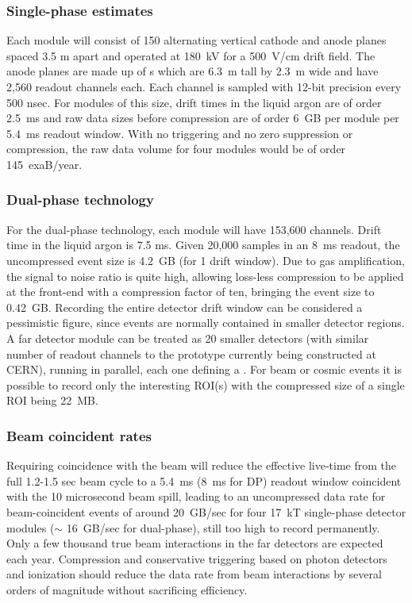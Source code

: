 \subsubsection{Single-phase estimates}
 Each    module will consist of 
150 alternating vertical cathode and anode planes  spaced 3.5 m apart and operated at 180~kV for a 500~V/cm drift field.  The anode planes are made up of s which are 6.3~m tall by 2.3~m wide and have 2,560 readout channels each. Each channel is sampled with 12-bit precision every 500 nsec. %
For modules of this size, drift times in the liquid argon are of order 2.5~ms and raw data sizes before compression are of order 6~GB per module per 5.4~ms readout window.  With no triggering and no zero suppression or compression, the raw data volume for four modules would be of order 145~exaB/year. 




\subsubsection{Dual-phase technology}

For the dual-phase technology, each  module will have 153,600 channels. Drift time in the liquid argon is 7.5 ms. Given 20,000 samples in an 8~ms readout, the uncompressed event size is 4.2~GB (for 1 drift window).  Due to gas amplification, the signal to noise ratio is quite high, allowing loss-less compression to be applied at the front-end  with a compression factor of ten, bringing the event size to 0.42~GB. Recording the entire detector drift window can be considered a pessimistic figure, since events are normally contained in smaller detector regions. A  far detector module can be treated as 20 smaller  detectors (with similar number  of readout channels to the prototype currently being constructed at CERN), running in parallel, each one defining a . For beam or cosmic events it is possible to record only the interesting ROI(s) with the compressed size of a single ROI being 22~MB.

\subsubsection{Beam coincident rates}

Requiring  coincidence with the  beam will reduce the effective live-time from the full 1.2-1.5 sec beam cycle to a 5.4~ms (8~ms for DP)  readout window coincident with the 10 microsecond beam spill, leading to an uncompressed data rate for beam-coincident events of around 20~GB/sec for four 17~kT single-phase detector modules ($\sim$ 16~GB/sec for dual-phase), still too high to record permanently.
Only a few thousand true beam interactions in the far detectors are expected each year.  Compression and conservative triggering based on photon detectors and ionization should reduce the data rate from beam interactions by several orders of magnitude without sacrificing efficiency.

